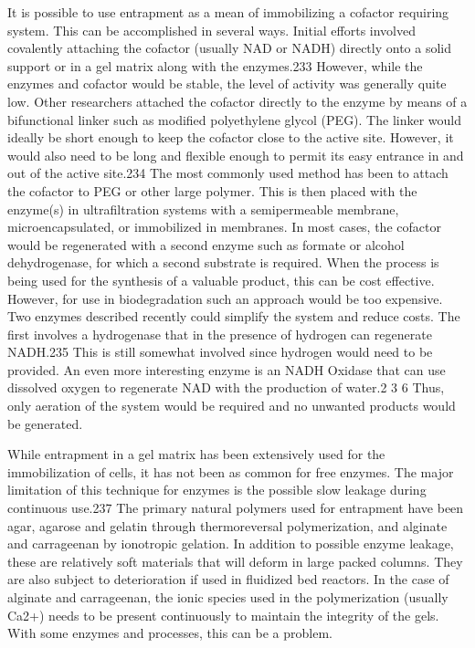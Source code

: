 \begin{refsection}
It is possible to use entrapment as a mean of immobilizing a cofactor requiring
system. This can be accomplished in several ways. Initial efforts involved
covalently attaching the cofactor (usually NAD or NADH) directly onto a solid
support or in a gel matrix along with the enzymes.233 However, while the
enzymes and cofactor would be stable, the level of activity was generally quite
low. Other researchers attached the cofactor directly to the enzyme by means of
a bifunctional linker such as modified polyethylene glycol (PEG). The linker
would ideally be short enough to keep the cofactor close to the active site.
However, it would also need to be long and flexible enough to permit its easy
entrance in and out of the active site.234 The most commonly used method has
been to attach the cofactor to PEG or other large polymer. This is then placed
with the enzyme(s) in ultrafiltration systems with a semipermeable membrane,
microencapsulated, or immobilized in membranes. In most cases, the cofactor
would be regenerated with a second enzyme such as formate or alcohol
dehydrogenase, for which a second substrate is required. When the process is
being used for the synthesis of a valuable product, this can be cost effective.
However, for use in biodegradation such an approach would be too expensive. Two
enzymes described recently could simplify the system and reduce costs. The
first involves a hydrogenase that in the presence of hydrogen can regenerate
NADH.235 This is still somewhat involved since hydrogen would need to be
provided. An even more interesting enzyme is an NADH Oxidase that can use
dissolved oxygen to regenerate NAD with the production of water.2 3 6 Thus,
only aeration of the system would be required and no unwanted products would be
generated.

While entrapment in a gel matrix has been extensively used for the
immobilization of cells, it has not been as common for free enzymes. The major
limitation of this technique for enzymes is the possible slow leakage during
continuous use.237 The primary natural polymers used for entrapment have been
agar, agarose and gelatin through thermoreversal polymerization, and alginate
and carrageenan by ionotropic gelation. In addition to possible enzyme leakage,
these are relatively soft materials that will deform in large packed columns.
They are also subject to deterioration if used in fluidized bed reactors. In
the case of alginate and carrageenan, the ionic species used in the
polymerization (usually Ca2+) needs to be present continuously to maintain the
integrity of the gels. With some enzymes and processes, this can be a problem.


\end{refsection}
